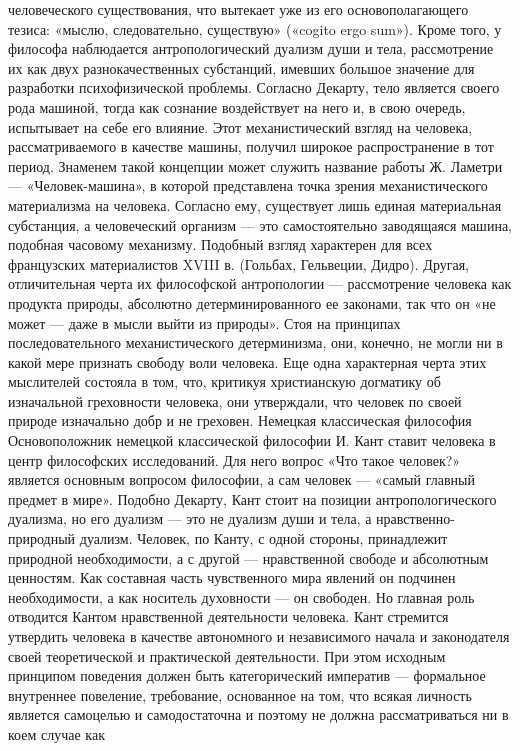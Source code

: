 \documentclass[12pt]{article}
\begin{document}
человеческого существования, что вытекает уже из его основополагающего тезиса: «мыслю, следовательно,
существую» («cogito ergo sum»). Кроме того, у философа наблюдается антропологический дуализм души и тела,
рассмотрение их как двух разнокачественных субстанций, имевших большое значение для разработки
психофизической проблемы. Согласно Декарту, тело является своего рода машиной, тогда как сознание
воздействует на него и, в свою очередь, испытывает на себе его влияние.
Этот механистический взгляд на человека, рассматриваемого в качестве машины, получил широкое
распространение в тот период. Знаменем такой концепции может служить название работы Ж. Ламетри —
«Человек-машина», в которой представлена точка зрения механистического материализма на человека.
Согласно ему, существует лишь единая материальная субстанция, а человеческий организм — это
самостоятельно заводящаяся машина, подобная часовому механизму.
Подобный взгляд характерен для всех французских материалистов XVIII в. (Гольбах, Гельвеции, Дидро).
Другая, отличительная черта их философской антропологии — рассмотрение человека как продукта природы,
абсолютно детерминированного ее законами, так что он «не может — даже в мысли выйти из природы». Стоя на
принципах последовательного механистического детерминизма, они, конечно, не могли ни в какой мере
признать свободу воли человека. Еще одна характерная черта этих мыслителей состояла в том, что, критикуя
христианскую догматику об изначальной греховности человека, они утверждали, что человек по своей природе
изначально добр и не греховен.
Немецкая классическая философия
Основоположник немецкой классической философии И. Кант ставит человека в центр философских
исследований. Для него вопрос «Что такое человек?» является основным вопросом философии, а сам человек
— «самый главный предмет в мире». Подобно Декарту, Кант стоит на позиции антропологического дуализма,
но его дуализм — это не дуализм души и тела, а нравственно-природный дуализм. Человек, по Канту, с одной
стороны, принадлежит природной необходимости, а с другой — нравственной свободе и абсолютным
ценностям. Как составная часть чувственного мира явлений он подчинен необходимости, а как носитель
духовности — он свободен. Но главная роль отводится Кантом нравственной деятельности человека.
Кант стремится утвердить человека в качестве автономного и независимого начала и законодателя своей
теоретической и практической деятельности. При этом исходным принципом поведения должен быть
категорический императив — формальное внутреннее повеление, требование, основанное на том, что всякая
личность является самоцелью и самодостаточна и поэтому не должна рассматриваться ни в коем случае как
\end{document}
